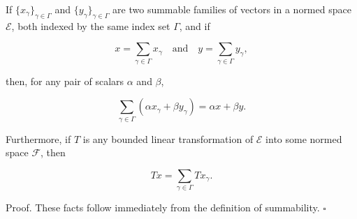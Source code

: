If $\{x_{\gamma}\}_{\gamma \in \Gamma}$ and $\{y_{\gamma}\}_{\gamma \in \Gamma}$ are two summable families of vectors in a normed space $\mathcal{E}$, both indexed by the same index set $\Gamma$, and if

$$x = \sum_{\gamma \in \Gamma} x_{\gamma} \quad \text{and} \quad y = \sum_{\gamma \in \Gamma} y_{\gamma},$$

then, for any pair of scalars $\alpha$ and $\beta$,

$$\sum_{\gamma \in \Gamma} (\alpha x_{\gamma} + \beta y_{\gamma}) = \alpha x + \beta y.$$

Furthermore, if $T$ is any bounded linear transformation of $\mathcal{E}$ into some normed space $\mathcal{F}$, then

$$Tx = \sum_{\gamma \in \Gamma} Tx_{\gamma}.$$

Proof. These facts follow immediately from the definition of summability. $\square$
